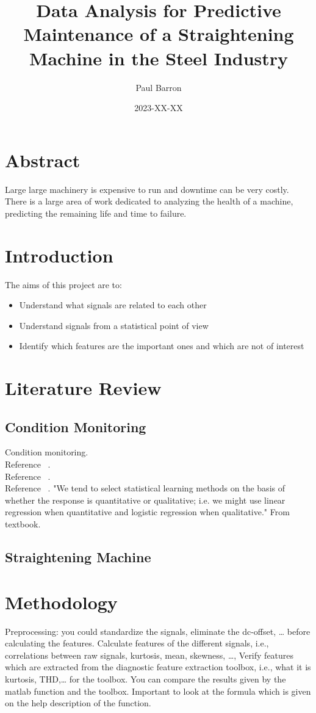 \documentclass{article}
\title{Data Analysis for Predictive Maintenance of a Straightening Machine in the Steel Industry}
\date{2023-XX-XX}
\author{Paul Barron}
\begin{document}
\maketitle
\newpage
{}
\tableofcontents
\newpage
\section{Abstract}
Large large machinery is expensive to run and downtime can be very costly. There is a large area of work dedicated to analyzing the health of a machine, predicting the remaining life and time to failure.
\newpage
\section{Introduction}
The aims of this project are to:
\begin{itemize}
\item Understand what signals are related to each other
\item Understand signals from a statistical point of view
\item Identify which features are the important ones and which are not of interest
\end{itemize}
\newpage  
\section{Literature Review}
\subsection{Condition Monitoring}
Condition monitoring.\\
Reference ~\cite{caesarendra2017review}.\\
Reference ~\cite{james2013introduction}.\\
Reference ~\cite{soualhi2021novel}.
"We tend to select statistical learning methods on the basis of whether
the response is quantitative or qualitative; i.e. we might use linear regression when quantitative and logistic regression when qualitative." From textbook.
\subsection{Straightening Machine}
\newpage  
\section{Methodology}
Preprocessing: you could standardize the signals, eliminate the dc-offset, … before calculating the features.
Calculate features of the different signals, i.e., correlations between raw signals, kurtosis, mean, skewness, …,
Verify features which are extracted from the diagnostic feature extraction toolbox, i.e., what it is kurtosis, THD,… for the toolbox. You can compare the results given by the matlab function and the toolbox. Important to look at the formula which is given on the help description of the function.
\end{document}

